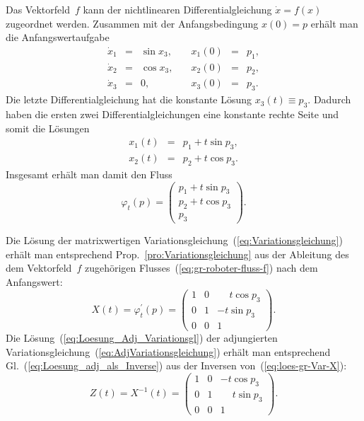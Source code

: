 \begin{loesung}Das Vektorfeld~$f$ kann der nicht\-linearen Differentialgleichung
$\dot{x}=f(x)$ zugeordnet werden. Zusammen mit der Anfangsbedingung
$x(0)=p$ erhält man die Anfangswertaufgabe
\[
\begin{array}{lcllcl}
\dot{x}_{1} & = & \sin x_{3},\quad & x_{1}(0) & = & p_{1},\\
\dot{x}_{2} & = & \cos x_{3},\quad & x_{2}(0) & = & p_{2},\\
\dot{x}_{3} & = & 0,\quad & x_{3}(0) & = & p_{3}.
\end{array}
\]
Die letzte Differentialgleichung hat die konstante Lösung $x_{3}(t)\equiv p_{3}$.
Dadurch haben die ersten zwei Differentialgleichungen eine konstante
rechte Seite und somit die Lösungen
\begin{eqnarray*}
x_{1}(t) & = & p_{1}+t\sin p_{3},\\
x_{2}(t) & = & p_{2}+t\cos p_{3}.
\end{eqnarray*}
Insgesamt erhält man damit den Fluss
\begin{equation}
\varphi_{t}(p)=\left(\begin{array}{c}
p_{1}+t\sin p_{3}\\
p_{2}+t\cos p_{3}\\
p_{3}
\end{array}\right).\label{eq:gr-roboter-fluss-f}
\end{equation}
\end{loesung}

\begin{loesung}Die Lösung der matrixwertigen Variationsgleichung~(\ref{eq:Variationsgleichung})
erhält man entsprechend Prop.~\ref{pro:Variationsgleichung} aus
der Ableitung des dem Vektorfeld~$f$ zugehörigen Flusses~(\ref{eq:gr-roboter-fluss-f})
nach dem Anfangswert:
\begin{equation}
X(t)=\varphi_{t}^{\prime}(p)=\left(\begin{array}{ccc}
1 & 0 & \phantom{-}t\cos p_{3}\\
0 & 1 & -t\sin p_{3}\\
0 & 0 & 1
\end{array}\right).\label{eq:loes-gr-Var-X}
\end{equation}
Die Lösung~(\ref{eq:Loesung_Adj_Variationsgl}) der adjungierten
Variationsgleichung~(\ref{eq:AdjVariationsgleichung}) erhält man
entsprechend Gl.~(\ref{eq:Loesung_adj_als_Inverse}) aus der Inversen
von~(\ref{eq:loes-gr-Var-X}):
\[
Z(t)=X^{-1}(t)=\left(\begin{array}{ccc}
1 & 0 & -t\cos p_{3}\\
0 & 1 & \phantom{-}t\sin p_{3}\\
0 & 0 & 1
\end{array}\right).
\]
\end{loesung}





